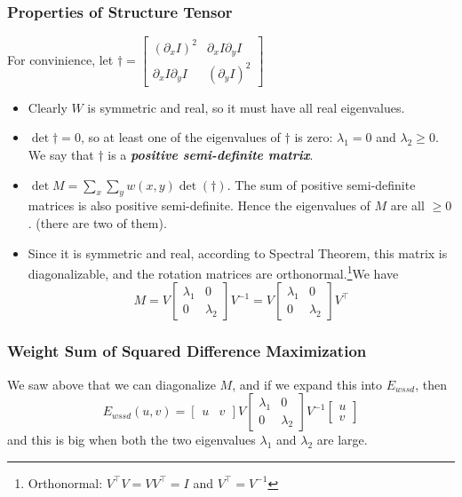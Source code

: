 \documentclass[11pt]{article}
\begin{document}
\subsubsection{Properties of Structure Tensor}
For convinience, let $\dagger = \begin{bmatrix}
		(\partial_x I )^2 & \partial_x I \partial_y I \\
		\partial_x I \partial_y I & (\partial_y I )^2 
	\end{bmatrix}$
\begin{itemize}
	\item Clearly $W$ is symmetric and real, so it must have all real eigenvalues. 
	\item $\det \dagger = 0$, so at least one of the eigenvalues of $\dagger$ is zero: $\lambda_1 = 0$ and $\lambda_2 \geq 0$. We say that $\dagger$ is a \textit{\textbf{positive semi-definite matrix}}.
	\item $\det M = \sum_x\sum_y w(x, y) \det (\dagger )$. The sum of positive semi-definite matrices is also positive semi-definite. Hence the eigenvalues of $M$ are all $\geq 0$. (there are two of them).
	\item Since it is symmetric and real, according to Spectral Theorem, this matrix is diagonalizable, and the rotation matrices are orthonormal.\footnote{Orthonormal: $V^\top V = VV^\top = I$ and $V^\top = V^{-1}$}We have 
	\begin{equation}
		M  = V \begin{bmatrix}
			\lambda_1 & 0 \\
			0 & \lambda_2
		\end{bmatrix} V^{-1} = V \begin{bmatrix}
			\lambda_1 & 0 \\
			0 & \lambda_2
		\end{bmatrix} V^{\top}
	\end{equation} 
\end{itemize}

\subsubsection{Weight Sum of Squared Difference Maximization}
We saw above that we can diagonalize $M$, and if we expand this into $E_{wssd}$, then 
\begin{equation}
	E_{wssd}(u, v) = \begin{bmatrix}
		u & v
	\end{bmatrix} V \begin{bmatrix}
		\lambda_1 & 0 \\
		0 & \lambda_2
	\end{bmatrix} V^{-1} \begin{bmatrix}
		u \\ v
	\end{bmatrix}
\end{equation}
and this is big when both the two eigenvalues $\lambda_1$ and $\lambda_2$ are large. 
\end{document}

